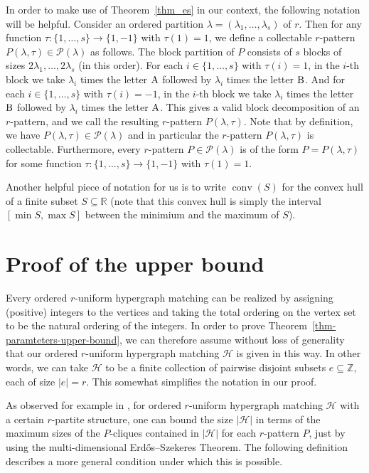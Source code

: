 \documentclass{aic}
\theoremstyle{definition}
\numberwithin{equation}{section}
\numberwithin{figure}{section}
\newcommand{\su}{\subseteq}
\newcommand{\Z}{\mathbb{Z}}
\newcommand{\HH}{\mathcal{H}}
\newcommand{\conv}{\operatorname{conv}}
\newcommand{\PP}{\mathcal{P}}
\begin{document}
In order to make use of Theorem~\ref{thm_es} in our context, the following notation will be helpful. Consider an ordered partition $\lambda=(\lambda_1,\dots,\lambda_s)$ of $r$. Then for any function $\tau:\{1,\dots,s\}\to \{1,-1\}$ with $\tau(1)=1$, we define a collectable $r$-pattern $P(\lambda,\tau)\in \PP(\lambda)$ as follows. The block partition of $P$ consists of $s$ blocks of sizes $2\lambda_1,\dots,2\lambda_s$ (in this order). For each $i\in\{1,\dots,s\}$ with $\tau(i)=1$, in the $i$-th block we take $\lambda_i$ times the letter $\rm A$ followed by $\lambda_i$ times the letter $\rm B$. And for each $i\in\{1,\dots,s\}$ with $\tau(i)=-1$, in the $i$-th block we take $\lambda_i$ times the letter $\rm B$ followed by $\lambda_i$ times the letter $\rm A$. This gives a valid block decomposition of an $r$-pattern, and we call the resulting $r$-pattern $P(\lambda,\tau)$. Note that by definition, we have $P(\lambda,\tau)\in \PP(\lambda)$ and in particular the $r$-pattern $P(\lambda,\tau)$ is collectable. Furthermore, every $r$-pattern $P\in \PP(\lambda)$ is of the form $P=P(\lambda,\tau)$ for some function $\tau:\{1,\dots,s\}\to \{1,-1\}$ with $\tau(1)=1$.

Another helpful piece of notation for us is to write $\conv(S)$ for the convex hull of a finite subset $S\su \mathbb{R}$ (note that this convex hull is simply the interval $[\min S,\max S]$ between the minimium and the maximum of $S$).


\section{Proof of the upper bound}
\label{sect-upper-bound}

Every ordered $r$-uniform hypergraph matching can be realized by assigning (positive) integers to the vertices and taking the total ordering on the vertex set to be the natural ordering of the integers. In order to prove Theorem~\ref{thm-paramteters-upper-bound}, we can therefore assume without loss of generality that our ordered $r$-uniform hypergraph matching $\HH$ is given in this way. In other words, we can take $\HH$ to be a finite collection of pairwise disjoint subsets $e\su \Z$, each of size $|e|=r$. This somewhat simplifies the notation in our proof.

As observed for example in \cite{AJKS}, for ordered $r$-uniform hypergraph matching $\HH$ with a certain $r$-partite structure, one can bound the size $|\HH|$ in terms of the maximum sizes of the $P$-cliques contained in $|\HH|$ for each $r$-pattern $P$, just by using the multi-dimensional Erd\H{o}s--Szekeres Theorem. The following definition describes a more general condition under which this is possible.
\end{document}
